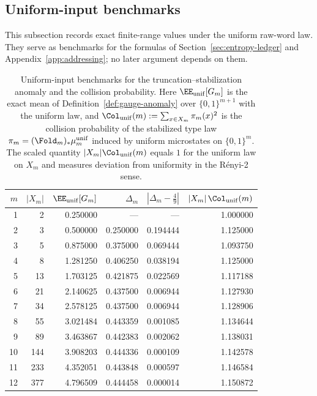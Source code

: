 \subsection{Uniform-input benchmarks}\label{app:numerics}

This subsection records exact finite-range values under the uniform raw-word law. They serve as benchmarks for the formulas of Section~\ref{sec:entropy-ledger} and Appendix~\ref{app:addressing}; no later argument depends on them.

\begin{table}[t]
\centering
\caption{Uniform-input benchmarks for the truncation--stabilization anomaly and the collision probability. Here $\EE_{\mathrm{unif}}[G_m]$ is the exact mean of Definition~\ref{def:gauge-anomaly} over $\{0,1\}^{m+1}$ with the uniform law, and $\Col_{\mathrm{unif}}(m):=\sum_{x\in X_m}\pi_m(x)^2$ is the collision probability of the stabilized type law $\pi_m=(\Fold_m)_*\mu_m^{\mathrm{unif}}$ induced by uniform microstates on $\{0,1\}^m$. The scaled quantity $|X_m|\Col_{\mathrm{unif}}(m)$ equals $1$ for the uniform law on $X_m$ and measures deviation from uniformity in the R\'enyi-2 sense.}
\label{tab:uniform-benchmarks}
\renewcommand{\arraystretch}{1.15}
\begin{tabular}{rrrrrr}
\toprule
$m$ & $|X_m|$ & $\EE_{\mathrm{unif}}[G_m]$ & $\Delta_m$ & $|\Delta_m-\tfrac49|$ & $|X_m|\,\Col_{\mathrm{unif}}(m)$ \\
\midrule
1 & 2 & 0.250000 & --- & --- & 1.000000 \\
2 & 3 & 0.500000 & 0.250000 & 0.194444 & 1.125000 \\
3 & 5 & 0.875000 & 0.375000 & 0.069444 & 1.093750 \\
4 & 8 & 1.281250 & 0.406250 & 0.038194 & 1.125000 \\
5 & 13 & 1.703125 & 0.421875 & 0.022569 & 1.117188 \\
6 & 21 & 2.140625 & 0.437500 & 0.006944 & 1.127930 \\
7 & 34 & 2.578125 & 0.437500 & 0.006944 & 1.128906 \\
8 & 55 & 3.021484 & 0.443359 & 0.001085 & 1.134644 \\
9 & 89 & 3.463867 & 0.442383 & 0.002062 & 1.138031 \\
10 & 144 & 3.908203 & 0.444336 & 0.000109 & 1.142578 \\
11 & 233 & 4.352051 & 0.443848 & 0.000597 & 1.146584 \\
12 & 377 & 4.796509 & 0.444458 & 0.000014 & 1.150872 \\

\end{tabular}
\end{table}
